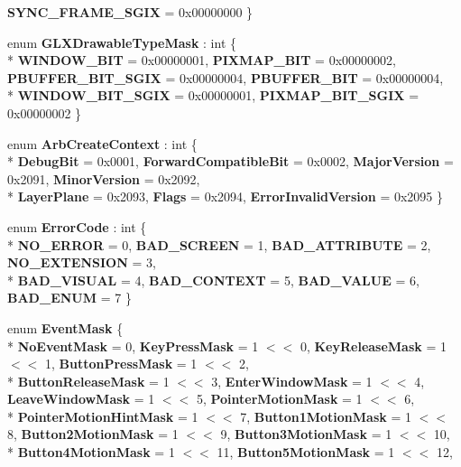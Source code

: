\begin{DoxyCompactItemize}
{\bfseries S\-Y\-N\-C\-\_\-\-F\-R\-A\-M\-E\-\_\-\-S\-G\-I\-X} = 0x00000000
 \}
\item 
enum {\bfseries G\-L\-X\-Drawable\-Type\-Mask} \-: int \{ \\*
{\bfseries W\-I\-N\-D\-O\-W\-\_\-\-B\-I\-T} = 0x00000001, 
{\bfseries P\-I\-X\-M\-A\-P\-\_\-\-B\-I\-T} = 0x00000002, 
{\bfseries P\-B\-U\-F\-F\-E\-R\-\_\-\-B\-I\-T\-\_\-\-S\-G\-I\-X} = 0x00000004, 
{\bfseries P\-B\-U\-F\-F\-E\-R\-\_\-\-B\-I\-T} = 0x00000004, 
\\*
{\bfseries W\-I\-N\-D\-O\-W\-\_\-\-B\-I\-T\-\_\-\-S\-G\-I\-X} = 0x00000001, 
{\bfseries P\-I\-X\-M\-A\-P\-\_\-\-B\-I\-T\-\_\-\-S\-G\-I\-X} = 0x00000002
 \}
\item 
enum {\bfseries Arb\-Create\-Context} \-: int \{ \\*
{\bfseries Debug\-Bit} = 0x0001, 
{\bfseries Forward\-Compatible\-Bit} = 0x0002, 
{\bfseries Major\-Version} = 0x2091, 
{\bfseries Minor\-Version} = 0x2092, 
\\*
{\bfseries Layer\-Plane} = 0x2093, 
{\bfseries Flags} = 0x2094, 
{\bfseries Error\-Invalid\-Version} = 0x2095
 \}
\item 
enum {\bfseries Error\-Code} \-: int \{ \\*
{\bfseries N\-O\-\_\-\-E\-R\-R\-O\-R} = 0, 
{\bfseries B\-A\-D\-\_\-\-S\-C\-R\-E\-E\-N} = 1, 
{\bfseries B\-A\-D\-\_\-\-A\-T\-T\-R\-I\-B\-U\-T\-E} = 2, 
{\bfseries N\-O\-\_\-\-E\-X\-T\-E\-N\-S\-I\-O\-N} = 3, 
\\*
{\bfseries B\-A\-D\-\_\-\-V\-I\-S\-U\-A\-L} = 4, 
{\bfseries B\-A\-D\-\_\-\-C\-O\-N\-T\-E\-X\-T} = 5, 
{\bfseries B\-A\-D\-\_\-\-V\-A\-L\-U\-E} = 6, 
{\bfseries B\-A\-D\-\_\-\-E\-N\-U\-M} = 7
 \}
\item 
enum {\bfseries Event\-Mask} \{ \\*
{\bfseries No\-Event\-Mask} = 0, 
{\bfseries Key\-Press\-Mask} = 1 $<$$<$ 0, 
{\bfseries Key\-Release\-Mask} = 1 $<$$<$ 1, 
{\bfseries Button\-Press\-Mask} = 1 $<$$<$ 2, 
\\*
{\bfseries Button\-Release\-Mask} = 1 $<$$<$ 3, 
{\bfseries Enter\-Window\-Mask} = 1 $<$$<$ 4, 
{\bfseries Leave\-Window\-Mask} = 1 $<$$<$ 5, 
{\bfseries Pointer\-Motion\-Mask} = 1 $<$$<$ 6, 
\\*
{\bfseries Pointer\-Motion\-Hint\-Mask} = 1 $<$$<$ 7, 
{\bfseries Button1\-Motion\-Mask} = 1 $<$$<$ 8, 
{\bfseries Button2\-Motion\-Mask} = 1 $<$$<$ 9, 
{\bfseries Button3\-Motion\-Mask} = 1 $<$$<$ 10, 
\\*
{\bfseries Button4\-Motion\-Mask} = 1 $<$$<$ 11, 
{\bfseries Button5\-Motion\-Mask} = 1 $<$$<$ 12, 
$$
\end{DoxyCompactItemize}
